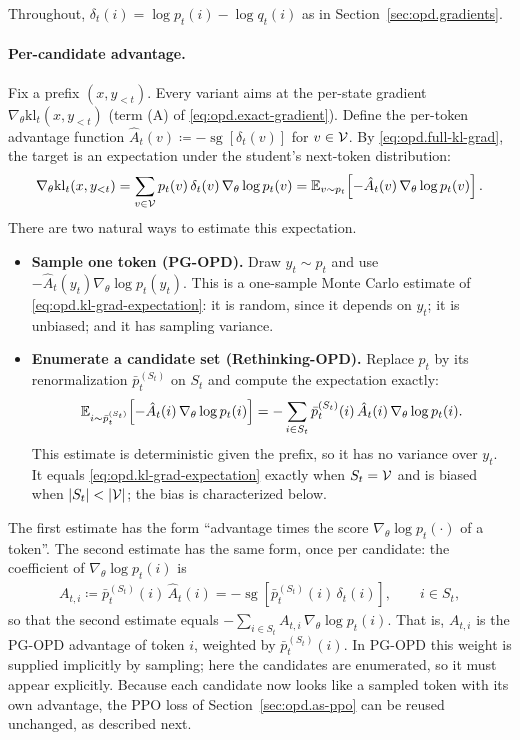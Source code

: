 Throughout, $\delta_t(i)=\log p_t(i)-\log q_t(i)$ as in Section~\ref{sec:opd.gradients}.

\paragraph{Per-candidate advantage.}
Fix a prefix $(x,y_{<t})$. Every variant aims at the per-state gradient
$\nabla_\theta\mathrm{kl}_t(x,y_{<t})$ (term (A) of \eqref{eq:opd.exact-gradient}). Define the
per-token advantage function $\hat A_t(v)\coloneqq-\operatorname{sg}[\delta_t(v)]$ for
$v\in{\cal V}$. By \eqref{eq:opd.full-kl-grad}, the target is an expectation under the student's
next-token distribution:
\begin{align}
    \nabla_\theta\mathrm{kl}_t(x,y_{<t})
    =
    \sum_{v\in{\cal V}}p_t(v)\,\delta_t(v)\,\nabla_\theta\log p_t(v)
    =
    \mathbb{E}_{v\sim p_t}\!\left[-\hat A_t(v)\,\nabla_\theta\log p_t(v)\right].
    \label{eq:opd.kl-grad-expectation}
\end{align}
There are two natural ways to estimate this expectation.
\begin{itemize}
    \item \textbf{Sample one token (PG-OPD).} Draw $y_t\sim p_t$ and use
    $-\hat A_t(y_t)\nabla_\theta\log p_t(y_t)$. This is a one-sample Monte Carlo estimate of
    \eqref{eq:opd.kl-grad-expectation}: it is random, since it depends on $y_t$; it is
    unbiased; and it has sampling variance.
    \item \textbf{Enumerate a candidate set (Rethinking-OPD).} Replace $p_t$ by its
    renormalization $\bar p_t^{(S_t)}$ on $S_t$ and compute the expectation exactly:
    \begin{align*}
        \mathbb{E}_{i\sim\bar p_t^{(S_t)}}\!\left[-\hat A_t(i)\,\nabla_\theta\log p_t(i)\right]
        =
        -\sum_{i\in S_t}\bar p_t^{(S_t)}(i)\,\hat A_t(i)\,\nabla_\theta\log p_t(i).
    \end{align*}
    This estimate is deterministic given the prefix, so it has no variance over $y_t$. It
    equals \eqref{eq:opd.kl-grad-expectation} exactly when $S_t={\cal V}$ and is biased when
    $|S_t|<|\Vcal|$; the bias is characterized below.
\end{itemize}
The first estimate has the form ``advantage times the score $\nabla_\theta\log p_t(\cdot)$ of a
token''. The second estimate has the same form, once per candidate: the coefficient of
$\nabla_\theta\log p_t(i)$ is
\begin{align}
    A_{t,i}
    \coloneqq
    \bar p_t^{(S_t)}(i)\,\hat A_t(i)
    =
    -\operatorname{sg}\!\left[
        \bar p_t^{(S_t)}(i)\,\delta_t(i)
    \right],
    \qquad i\in S_t,
    \label{eq:opd.rethinking-cand-advantage}
\end{align}
so that the second estimate equals $-\sum_{i\in S_t}A_{t,i}\,\nabla_\theta\log p_t(i)$. That is,
$A_{t,i}$ is the PG-OPD advantage of token $i$, weighted by $\bar p_t^{(S_t)}(i)$. In PG-OPD this
weight is supplied implicitly by sampling; here the candidates are enumerated, so it must
appear explicitly. Because each candidate now looks like a sampled token with its own
advantage, the PPO loss of Section~\ref{sec:opd.as-ppo} can be reused unchanged, as described next.

